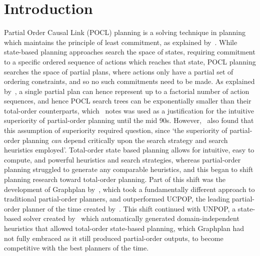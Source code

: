 \chapter{Introduction}\label{chap:introduction}

Partial Order Causal Link (POCL) planning is a solving technique in planning which maintains the principle of least commitment, as explained by~\cite{Weld1994LeastCommitmentPlanning}. While state-based planning approaches search the space of states, requiring commitment to a specific ordered sequence of actions which reaches that state, POCL planning searches the space of partial plans, where actions only have a partial set of ordering constraints, and so no such commitments need to be made. As explained by~\cite{Minton1994TotalVsPartialPlanning}, a single partial plan can hence represent up to a factorial number of action sequences, and hence POCL search trees can be exponentially smaller than their total-order counterparts, which~\cite{Weld2011NonlinearPlanningCommentary} notes was used as a justification for the intuitive superiority of partial-order planning until the mid 90s. However,~\cite{Minton1994TotalVsPartialPlanning} also found that this assumption of superiority required question, since `the superiority of partial-order planning \textit{can} depend critically upon the search strategy and search heuristics employed'. Total-order state based planning allows for intuitive, easy to compute, and powerful heuristics and search strategies, whereas partial-order planning struggled to generate any comparable heuristics, and this began to shift planning research toward total-order planning. Part of this shift was the development of Graphplan by~\cite{Blum1995Graphplan}, which took a fundamentally different approach to traditional partial-order planners, and outperformed UCPOP, the leading partial-order planner of the time created by~\cite{Penberthy1992UCPOP}. This shift continued with UNPOP, a state-based solver created by~\cite{McDermott1996UNPOP} which automatically generated domain-independent heuristics that allowed total-order state-based planning, which Graphplan had not fully embraced as it still produced partial-order outputs, to become competitive with the best planners of the time.\\


